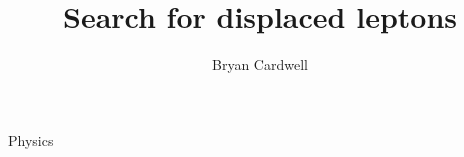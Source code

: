\documentclass{osudissert96}
\begin{document}
\author{Bryan Cardwell}
\title{Search for displaced leptons}
\unit{Physics}
\maketitle

\disscopyright

\begin{abstract}
  
\end{abstract}

\dedication{For Cristiana and Montague.}



\tableofcontents
\listoftables
\listoffigures






\appendix






\end{document}
